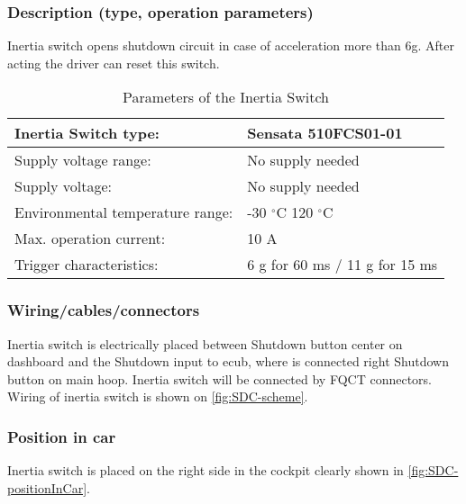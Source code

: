 \subsubsection{Description (type, operation parameters)}
\iffalse Describe the Inertia Switch used and use a table for the common operation parameters, like supply voltage, temperature, etc.
Additionally, fill out the following table replacing the values with your specification: \fi

Inertia switch opens shutdown circuit in case of acceleration more than 6g. After acting the driver can reset this switch.
\begin{table}[H]
	\centering
	\caption{Parameters of the Inertia Switch}
	\begin{tabu}{|X|l|}
	\hline	Inertia Switch type: & Sensata 510FCS01-01 \\
	\hline	Supply voltage range: & No supply needed \\
	\hline	Supply voltage: & No supply needed \\
	\hline	Environmental temperature range: & -30 $^\circ$C 120 $^\circ$C \\
	\hline	Max. operation current: & 10 A \\
	\hline	Trigger characteristics: & 6 g for 60 ms / 11 g for 15 ms \\
	\hline
	\end{tabu}%
	\label{tab:inertiaSwitch}%
\end{table}%


\subsubsection{Wiring/cables/connectors}

Inertia switch is electrically placed between Shutdown button center on dashboard and the Shutdown input to \gls{ecub}, where is connected right Shutdown button on main hoop. Inertia switch will be connected by FQCT connectors. Wiring of inertia switch is shown on \ref{fig:SDC-scheme}.

\subsubsection{Position in car}

Inertia switch is placed on the right side in the cockpit clearly shown in \ref{fig:SDC-positionInCar}.